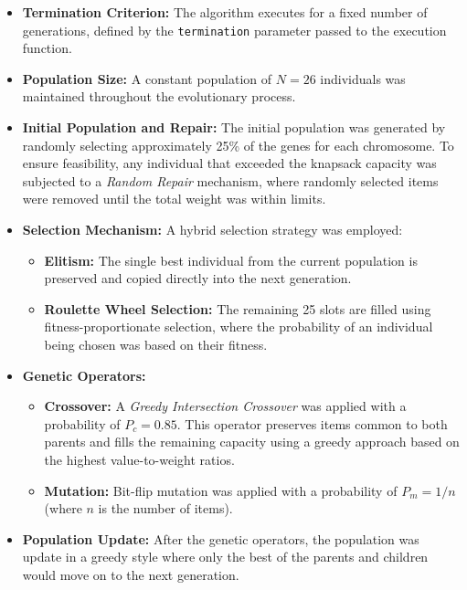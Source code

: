 \documentclass{article}
\begin{document}
\begin{itemize}
    \item \textbf{Termination Criterion:} The algorithm executes for a fixed number of generations, defined by the \texttt{termination} parameter passed to the execution function.
    
    \item \textbf{Population Size:} A constant population of $N = 26$ individuals was maintained throughout the evolutionary process.
    
    \item \textbf{Initial Population and Repair:} The initial population was generated by randomly selecting approximately 25\% of the genes for each chromosome. To ensure feasibility, any individual that exceeded the knapsack capacity was subjected to a \textit{Random Repair} mechanism, where randomly selected items were removed until the total weight was within limits.
    
    \item \textbf{Selection Mechanism:} A hybrid selection strategy was employed:
    \begin{itemize}
        \item \textbf{Elitism:} The single best individual from the current population is preserved and copied directly into the next generation.
        \item \textbf{Roulette Wheel Selection:} The remaining 25 slots are filled using fitness-proportionate selection, where the probability of an individual being chosen was based on their fitness.
    \end{itemize}
    
    \item \textbf{Genetic Operators:}
    \begin{itemize}
        \item \textbf{Crossover:} A \textit{Greedy Intersection Crossover} was applied with a probability of $P_c = 0.85$. This operator preserves items common to both parents and fills the remaining capacity using a greedy approach based on the highest value-to-weight ratios.
        \item \textbf{Mutation:} Bit-flip mutation was applied with a probability of $P_m = 1/n$ (where $n$ is the number of items). 
    \end{itemize}
    
    \item \textbf{Population Update:} After the genetic operators, the population was update in a greedy style where only the best of the parents and children would move on to the next generation.
\end{itemize}
\end{document}
